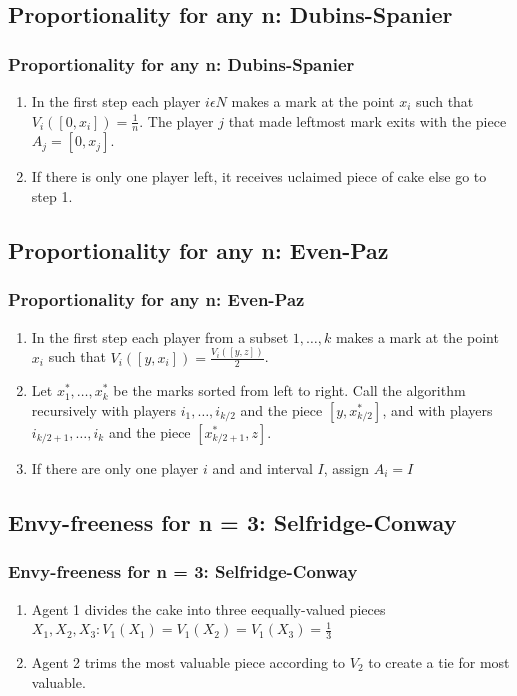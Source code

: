 \documentclass{beamer}
\begin{document}
\subsection{Proportionality for any n: Dubins-Spanier}
\begin{frame}
\frametitle{Proportionality for any n: Dubins-Spanier}
\begin{enumerate}
    \item In the first step each player $i\epsilon{N}$ makes a mark at the point $x_i$ such that $V_{i}([0,x_i])=\frac{1}{n}$. The player $j$ that made leftmost mark exits with the piece $A_j=[0, x_j]$.
    \item If there is only one player left, it receives uclaimed piece of cake else go to step 1.
\end{enumerate}
\end{frame}

\subsection{Proportionality for any n: Even-Paz}
\begin{frame}
\frametitle{Proportionality for any n: Even-Paz}
\begin{enumerate}
    \item In the first step each player from a subset ${1,\dots,k}$ makes a mark at the point $x_i$ such that $V_{i}([y,x_i])=\frac{V_{i}([y,z])}{2}$. 
    \item Let $x_1^*,\dots,x_k^*$ be the marks sorted from left to right. Call the algorithm recursively with players $i_{1},\dots,i_{k/2}$ and the piece $[y,x_{k/2}^*]$, and with players $i_{k/2+1},\dots,i_{k}$ and the piece $[x_{k/2+1}^{*},z]$.
    \item If there are only one player $i$ and and interval $I$, assign $A_{i}=I$ 
\end{enumerate}

\end{frame}


\subsection{Envy-freeness for n = 3: Selfridge-Conway}
\begin{frame}
\frametitle{Envy-freeness for n = 3: Selfridge-Conway}
\begin{enumerate}
    \item Agent 1 divides the cake into three eequally-valued pieces $X_1, X_2, X_3: V_1(X_1)=V_1(X_2)=V_1(X_3)=\frac{1}{3}$
    \item Agent 2 trims the most valuable piece according to $V_2$ to create a tie for most valuable. 
\end{enumerate}
\end{frame}
\end{document}

